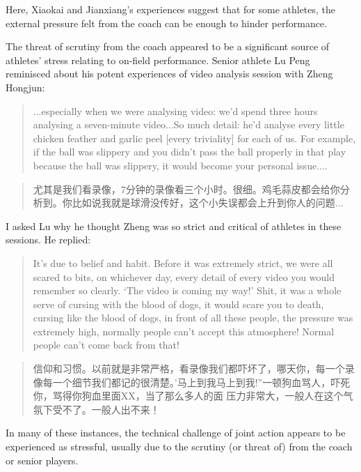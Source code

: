 \begin{CJK}{UTF8}{gbsn}
Here, Xiaokai and Jianxiang's experiences suggest that for some athletes, the external pressure felt from the coach can be enough to hinder performance.

The threat of scrutiny from the coach appeared to be a significant source of athletes' stress relating to on-field performance.  Senior athlete Lu Peng reminisced about his potent experiences of video analysis session with Zheng Hongjun:

\begin{quote}
  ...especially when we were analysing video: we'd spend three hours analysing a seven-minute video...So much detail: he'd analyse every little chicken feather and garlic peel [every triviality] for each of us. For example, if the ball was slippery and you didn't pass the ball properly in that play because the ball was slippery, it would become your personal issue....
\end{quote}

\begin{quote}
    尤其是我们看录像，7分钟的录像看三个小时。很细。鸡毛蒜皮都会给你分析到。你比如说我就是球滑没传好，这个小失误都会上升到你人的问题...
\end{quote}

I asked Lu why he thought Zheng was so strict and critical of athletes in these sessions.  He replied:

\begin{quote}
    It's due to belief and habit. Before it was extremely strict, we were all scared to bits, on whichever day, every detail of every video you would remember so clearly. `The video is coming my way!'  Shit, it was a whole serve of cursing with the blood of dogs, it would scare you to death, cursing like the blood of dogs, in front of all these people, the pressure was extremely high, normally people can’t accept this atmosphere! Normal people can’t come back from that!
\end{quote}

  \begin{quote}
      信仰和习惯。以前就是非常严格，看录像我们都吓坏了，哪天你，每一个录像每一个细节我们都记的很清楚。'马上到我马上到我!''一顿狗血骂人，吓死你，骂得你狗血里面XX，当了那么多人的面 压力非常大，一般人在这个气氛下受不了。一般人出不来！
  \end{quote}


In many of these instances, the technical challenge of joint action appears to be experienced as stressful, usually due to the scrutiny (or threat of) from the coach or senior players.



\end{CJK}
